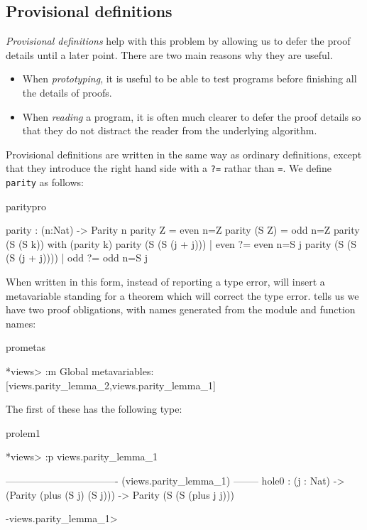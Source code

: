 \subsection{Provisional definitions}

\emph{Provisional definitions} help with this problem by allowing us to defer the
proof details until a later point. There are two main reasons why they are
useful.

\begin{itemize}
\item When \emph{prototyping}, it is useful to be able to test programs before
finishing all the details of proofs.  
\item When \emph{reading} a program, it is often much clearer to defer the proof
details so that they do not distract the reader from the underlying algorithm.
\end{itemize}

\noindent
Provisional definitions are written in the same way as ordinary definitions,
except that they introduce the right hand side with a \texttt{?=} rathar than
\texttt{=}. We define
\texttt{parity} as follows:

\begin{SaveVerbatim}{paritypro}

parity : (n:Nat) -> Parity n
parity Z     = even {n=Z}
parity (S Z) = odd {n=Z}
parity (S (S k)) with (parity k)
  parity (S (S (j + j)))     | even ?= even {n=S j}
  parity (S (S (S (j + j)))) | odd  ?= odd {n=S j}

\end{SaveVerbatim}

\noindent
When written in this form, instead of reporting a type error, \Idris{} will insert
a metavariable standing for a theorem which will correct the type error. \Idris{} 
tells us we have two proof obligations, with names generated from the module and
function names:

\begin{SaveVerbatim}{prometas}

*views> :m 
Global metavariables:
        [views.parity_lemma_2,views.parity_lemma_1]

\end{SaveVerbatim}

\noindent
The first of these has the following type:

\begin{SaveVerbatim}{prolem1}

*views> :p views.parity_lemma_1 

---------------------------------- (views.parity_lemma_1) --------
{hole0} : (j : Nat) -> (Parity (plus (S j) (S j))) -> Parity (S (S (plus j j)))

-views.parity_lemma_1>  

\end{SaveVerbatim}

